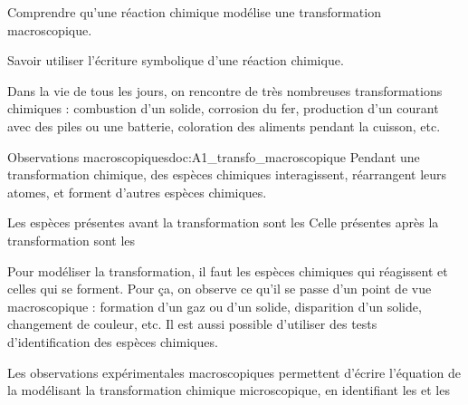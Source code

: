 \teteSndChim


\begin{objectifs}
  \item Comprendre qu'une réaction chimique modélise une transformation macroscopique.
  \item Savoir utiliser l'écriture symbolique d'une réaction chimique.
\end{objectifs}

\begin{contexte}
  Dans la vie de tous les jours, on rencontre de très nombreuses transformations chimiques : combustion d'un solide, corrosion du fer, production d'un courant avec des piles ou une batterie, coloration des aliments pendant la cuisson, etc.
  
\end{contexte}


\begin{doc}{Observations macroscopiques}{doc:A1_transfo_macroscopique}
  Pendant une transformation chimique, des espèces chimiques interagissent, réarrangent leurs atomes, et forment d'autres espèces chimiques.

  \begin{importants}  
    Les espèces présentes avant la transformation sont les 
    Celle présentes après la transformation sont les 
  \end{importants}
  
  Pour modéliser la transformation, il faut  les espèces chimiques qui réagissent et celles qui se forment.
  Pour ça, on observe ce qu'il se passe d'un point de vue macroscopique : formation d'un gaz ou d'un solide, disparition d'un solide, changement de couleur, etc.
  Il est aussi possible d'utiliser des tests d'identification des espèces chimiques.
  
  \begin{importants}
    Les observations expérimentales macroscopiques permettent d'écrire l'équation de la  modélisant la transformation chimique microscopique, en identifiant les  et les 
  \end{importants}
\end{doc}


